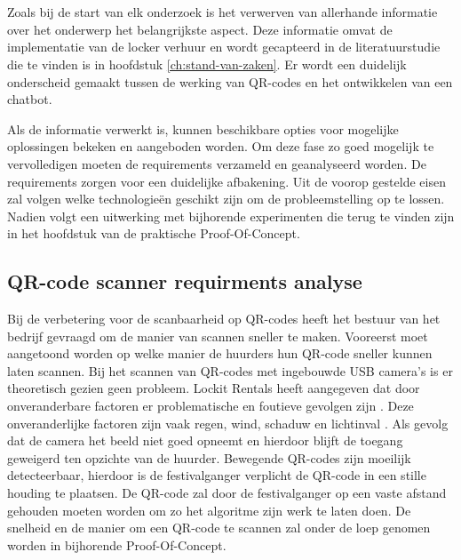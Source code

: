 
\chapter{}%
\label{ch:methodologie}


Zoals bij de start van elk onderzoek is het verwerven van allerhande informatie over het onderwerp het belangrijkste aspect. Deze informatie omvat de implementatie van de locker verhuur en wordt gecapteerd in de literatuurstudie die te vinden is in hoofdstuk \ref{ch:stand-van-zaken}. Er wordt een duidelijk onderscheid gemaakt tussen de werking van QR-codes en het ontwikkelen van een chatbot. 

Als de informatie verwerkt is, kunnen beschikbare opties voor mogelijke oplossingen bekeken en aangeboden worden. Om deze fase zo goed mogelijk te vervolledigen moeten de requirements verzameld en geanalyseerd worden. De requirements zorgen voor een duidelijke afbakening. Uit de voorop gestelde eisen zal volgen welke technologieën geschikt zijn om de probleemstelling op te lossen. Nadien volgt een uitwerking met bijhorende experimenten die terug te vinden zijn in het hoofdstuk van de praktische Proof-Of-Concept.


\section{QR-code scanner requirments analyse}%
\label{sec:scannerRequirment}

Bij de verbetering voor de scanbaarheid op QR-codes heeft het bestuur van het bedrijf gevraagd om de manier van scannen sneller te maken. Vooreerst moet aangetoond worden op welke manier de huurders hun QR-code sneller kunnen laten scannen. Bij het scannen van QR-codes met ingebouwde USB camera’s is er theoretisch gezien geen probleem. Lockit Rentals heeft aangegeven dat door onveranderbare factoren er problematische en foutieve gevolgen zijn \autocite{Girisha2022}. Deze onveranderlijke factoren zijn vaak regen, wind, schaduw en lichtinval \autocite{Ou2014}.  Als gevolg dat de camera het beeld niet goed opneemt en hierdoor blijft de toegang geweigerd ten opzichte van de huurder. 
Bewegende QR-codes zijn moeilijk detecteerbaar, hierdoor is de festivalganger verplicht de QR-code in een stille houding te plaatsen. De QR-code zal door de festivalganger op een vaste afstand gehouden moeten worden om zo het algoritme zijn werk te laten doen\autocite{Suriyon2021}. De snelheid en de manier om een QR-code te scannen zal onder de loep genomen worden in bijhorende Proof-Of-Concept.

